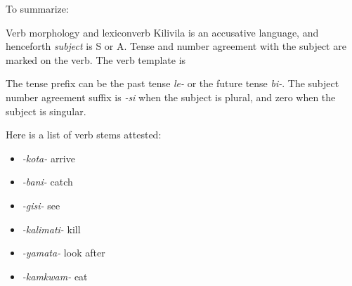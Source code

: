 \documentclass{article}
\newcommand*{\term}[1]{\emph{#1}}
\newcommand*{\corpus}[1]{\emph{#1}}
\begin{document}
To summarize:
\begin{infobox}{Verb morphology and lexicon}{verb}
    Kilivila is an accusative language, and henceforth \term{subject} is S or A.
    Tense and number agreement with the subject are marked on the verb.
    The verb template is 
    \begin{center}
    \end{center}
    The tense prefix can be the past tense \corpus{le-} or the future tense \corpus{bi-}.
    The subject number agreement suffix is 
    \corpus{-si} when the subject is plural,
    and zero when the subject is singular.

    Here is a list of verb stems attested:
    \begin{multicols}{2}     
        \begin{itemize}
            \item \corpus{-kota-} arrive
            \item \corpus{-bani-} catch
            \item \corpus{-gisi-} see 
            \item \corpus{-kalimati-} kill
            \item \corpus{-yamata-} look after
            \item \corpus{-kamkwam-} eat
        \end{itemize}
    \end{multicols}
\end{infobox}
\end{document}
